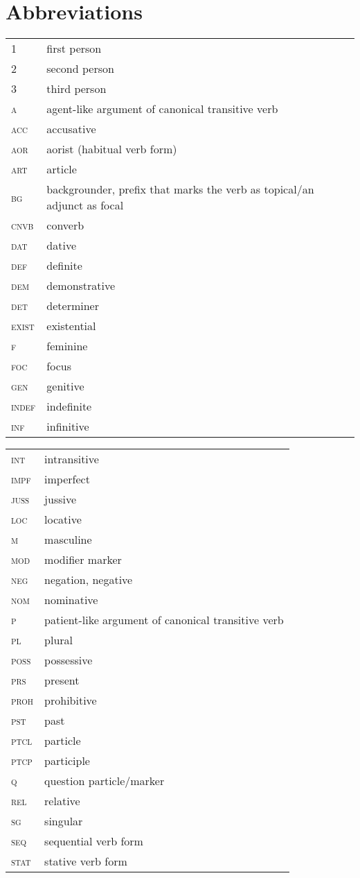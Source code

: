 \documentclass[output=paper]{LSP/langsci}
\begin{document}
\section*{Abbreviations}
\begin{tabularx}{.45\textwidth}{lQ}
1 & first person\\
2 & second person\\
3 & third person\\
\textsc{a} & agent-like argument of canonical transitive verb\\
\textsc{acc}	& accusative\\
\textsc{aor} & aorist (habitual verb form)\\
\textsc{art} & article\\
\textsc{bg} & backgrounder, prefix that marks the verb as topical/an adjunct as focal\\
\textsc{cnvb} & converb\\
\textsc{dat} & dative\\
\textsc{def} & definite\\
\textsc{dem} & demonstrative\\
\textsc{det} & determiner\\
\textsc{exist} & existential\\
\textsc{f} & feminine\\
\textsc{foc} & focus\\
\textsc{gen}	& genitive\\
\textsc{indef} & indefinite\\
\textsc{inf} & infinitive\\
\end{tabularx}
\begin{tabularx}{.45\textwidth}{lQ}
\textsc{int} & intransitive\\
\textsc{impf} & imperfect\\
\textsc{juss} & jussive\\
\textsc{loc} & locative\\
\textsc{m} & masculine\\
\textsc{mod} & modifier marker\\
\textsc{neg} & negation, negative\\
\textsc{nom} & nominative\\
\textsc{p} & patient-like argument of canonical transitive verb\\
\textsc{pl} & plural\\
\textsc{poss} & possessive\\
\textsc{prs} & present\\
\textsc{proh} & prohibitive\\
\textsc{pst} & past\\
\textsc{ptcl} & particle\\
\textsc{ptcp} & participle\\
\textsc{q} & question particle/marker\\
\textsc{rel} & relative\\
\textsc{sg} & singular\\
\textsc{seq} & sequential verb form\\
\textsc{stat} & stative verb form\\
\end{tabularx}


 
{\sloppy
\printbibliography[heading=subbibliography,notkeyword=this] }
\end{document}
